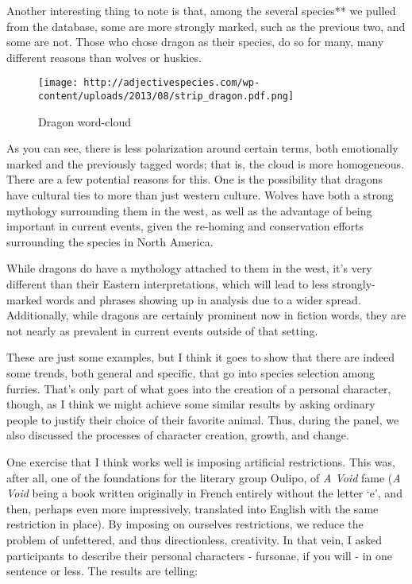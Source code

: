 Another interesting thing to note is that, among the several species**
we pulled from the database, some are more strongly marked, such as the
previous two, and some are not. Those who chose dragon as their species,
do so for many, many different reasons than wolves or huskies.

\begin{figure}[htbp]
\centering
\texttt{[image: http://adjectivespecies.com/wp-content/uploads/2013/08/strip\_dragon.pdf.png]}
\caption{Dragon word-cloud}
\end{figure}

As you can see, there is less polarization around certain terms, both
emotionally marked and the previously tagged words; that is, the cloud
is more homogeneous. There are a few potential reasons for this. One is
the possibility that dragons have cultural ties to more than just
western culture. Wolves have both a strong mythology surrounding them in
the west, as well as the advantage of being important in current events,
given the re-homing and conservation efforts surrounding the species in
North America.

While dragons do have a mythology attached to them in the west, it's
very different than their Eastern interpretations, which will lead to
less strongly-marked words and phrases showing up in analysis due to a
wider spread. Additionally, while dragons are certainly prominent now in
fiction words, they are not nearly as prevalent in current events
outside of that setting.

These are just some examples, but I think it goes to show that there are
indeed some trends, both general and specific, that go into species
selection among furries. That's only part of what goes into the creation
of a personal character, though, as I think we might achieve some
similar results by asking ordinary people to justify their choice of
their favorite animal. Thus, during the panel, we also discussed the
processes of character creation, growth, and change.

One exercise that I think works well is imposing artificial
restrictions. This was, after all, one of the foundations for the
literary group Oulipo, of \emph{A Void} fame (\emph{A Void} being a book
written originally in French entirely without the letter `e', and then,
perhaps even more impressively, translated into English with the same
restriction in place). By imposing on ourselves restrictions, we reduce
the problem of unfettered, and thus directionless, creativity. In that
vein, I asked participants to describe their personal characters -
fursonae, if you will - in one sentence or less. The results are
telling:

